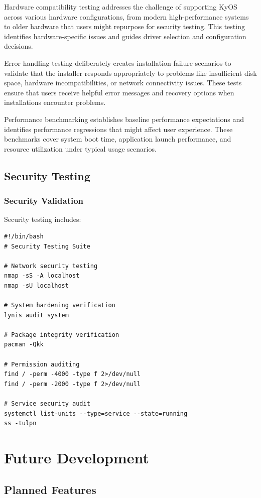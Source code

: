 \documentclass[12pt,a4paper]{article}
\begin{document}
Hardware compatibility testing addresses the challenge of supporting KyOS across various hardware configurations, from modern high-performance systems to older hardware that users might repurpose for security testing. This testing identifies hardware-specific issues and guides driver selection and configuration decisions.

Error handling testing deliberately creates installation failure scenarios to validate that the installer responds appropriately to problems like insufficient disk space, hardware incompatibilities, or network connectivity issues. These tests ensure that users receive helpful error messages and recovery options when installations encounter problems.

Performance benchmarking establishes baseline performance expectations and identifies performance regressions that might affect user experience. These benchmarks cover system boot time, application launch performance, and resource utilization under typical usage scenarios.

\subsection{Security Testing}

\subsubsection{Security Validation}
Security testing includes:

\begin{lstlisting}[caption=Security Testing Procedures]
#!/bin/bash
# Security Testing Suite

# Network security testing
nmap -sS -A localhost
nmap -sU localhost

# System hardening verification
lynis audit system

# Package integrity verification
pacman -Qkk

# Permission auditing
find / -perm -4000 -type f 2>/dev/null
find / -perm -2000 -type f 2>/dev/null

# Service security audit
systemctl list-units --type=service --state=running
ss -tulpn
\end{lstlisting}

\section{Future Development}

\subsection{Planned Features}
\end{document}
